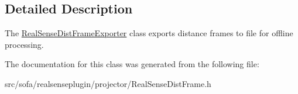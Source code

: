 \subsection{Detailed Description}
The \hyperlink{classsofa_1_1rgbdtracking_1_1_real_sense_dist_frame_exporter}{Real\+Sense\+Dist\+Frame\+Exporter} class exports distance frames to file for offline processing. 

The documentation for this class was generated from the following file\+:\begin{DoxyCompactItemize}
\item 
src/sofa/realsenseplugin/projector/Real\+Sense\+Dist\+Frame.\+h\end{DoxyCompactItemize}
